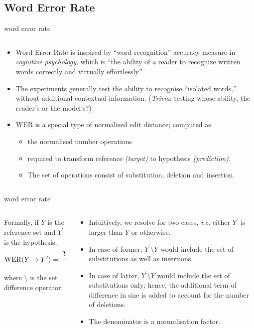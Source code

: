 \documentclass[aspectratio=169,xcolor={dvipsnames,svgnames}]{beamer}
\begin{document}
\subsection{Word Error Rate}
\label{sec:orgc4c763b}
\begin{frame}[label={sec:word-error-rate}]{word error rate}
\begin{columns}
\begin{column}{0.7\columnwidth}
\begin{itemize}[<only@+>]
\item Word Error Rate is inspired by “word recognition”
accuracy measure in \emph{cognitive psychology}, which is
“the ability of a reader to recognize written words
correctly and virtually effortlessly.”
\item The experiments generally test the ability to
recognise “isolated words,” without additional
contextual information.  (\emph{Trivia}: testing whose
ability, the reader’s or the model’s?)
\item WER is a special type of normalised edit distance;
computed as
\begin{itemize}[<.->]
\item the normalised number operations
\item required to transform reference \emph{(target)} to
hypothesis \emph{(prediction)}.
\item The set of operations consist of substitution,
deletion and insertion.
\end{itemize}
\end{itemize}
\end{column}
\end{columns}
\end{frame}
\begin{frame}[label={sec:orgb7102d1}]{word error rate}
\begin{columns}
\begin{column}{0.45\columnwidth}
Formally, if \(Y\) is the reference set and
  \(Y^{\prime}\) is the hypothesis,
\begin{align}
  \notag
  \mathrm{WER}(Y\to Y^\prime)
  &= \frac {|Y^\prime \setminus Y| + \left[
    |Y|-|Y^\prime| \right]_+} {|Y|}
\end{align}
where \(\setminus\) is the set difference operator.
\end{column}
\begin{column}{0.55\columnwidth}
\begin{itemize}
\item Intuitively, we resolve for two cases, \emph{i.e.} either
\(Y^{\prime}\) is larger than \(Y\) or otherwise.
\item In case of former, \(Y^\prime \setminus Y\) would
include the set of substitutions as well as
insertions.
\item In case of latter, \(Y^\prime \setminus Y\) would
include the set of substitutions only; hence, the
additional term of difference in size is added to
account for the number of deletions.
\item The denominator is a normalisation factor.
\end{itemize}
\end{column}
\end{columns}
\end{frame}
\end{document}
